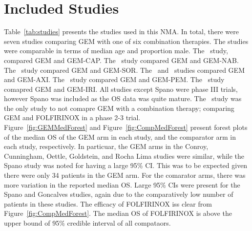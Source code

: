 \chapter{Included Studies}\label{trialschap}

Table~\ref{tab:studies} presents the studies used in this NMA. In total, there were seven studies comparing GEM with one of six combination therapies. The studies were comparable in terms of median age and proportion male. The~\cite{cunningham2009} study, compared GEM and GEM-CAP. The~\cite{goldstein2015} study compared GEM and GEM-NAB. The~\cite{gonccalves2012} study compared GEM and GEM-SOR. The~\cite{kindler2011} and~\cite{spano2008} studies compared GEM and GEM-AXI. The~\cite{oettle2005} study compared GEM and GEM-PEM. The~\cite{rocha2004} study comapred GEM and GEM-IRI. All studies except Spano were phase III trials, however Spano was included as the OS data was quite mature. The~\cite{conroy} study was the only study to not comapre GEM with a combination therapy; comparing GEM and FOLFIRINOX in a phase 2-3 trial.\\

Figure~\ref{fig:GEMMedForest} and Figure~\ref{fig:CompMedForest} present forest plots of the median OS of the GEM arm in each study, and the comparator arm in each study, respectively. In particuar, the GEM arms in the Conroy, Cunningham, Oettle, Goldstein, and Rocha Lima studies were similar, while the Spano study was noted for having a large 95\% CI. This was to be expected given there were only 34 patients in the GEM arm. For the comarator arms, there was more variation in the reported median OS. Large 95\% CIs were present for the Spano and Goncalves studies, again due to the comparatively low number of patients in these studies. The efficacy of FOLFIRINOX iss clear from Figure~\ref{fig:CompMedForest}. The median OS of FOLFIRINOX is above the upper bound of 95\% credible interval of all compataors. 

